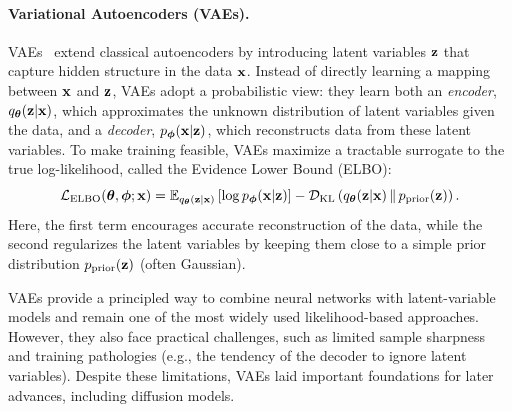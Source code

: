 \paragraph{Variational Autoencoders (VAEs).}
VAEs~\citep{kingma2013auto} extend classical autoencoders by introducing latent variables ${\mathbf{z}}$ that capture hidden structure in the data ${\mathbf{x}}$. 
Instead of directly learning a mapping between ${\mathbf{x}}$ and ${\mathbf{z}}$, VAEs adopt a probabilistic view: they learn both an \emph{encoder}, $q_{{\bm{\theta}}}({\mathbf{z}}|{\mathbf{x}})$, which approximates the unknown distribution of latent variables given the data, and a \emph{decoder}, $p_{{\bm{\phi}}}({\mathbf{x}}|{\mathbf{z}})$, which reconstructs data from these latent variables. 
To make training feasible, VAEs maximize a tractable surrogate to the true log-likelihood, called the Evidence Lower Bound (ELBO):
\begin{equation*}
    \mathcal{L}_{\text{ELBO}}({\bm{\theta}}, {\bm{\phi}}; {\mathbf{x}}) 
    = \mathbb{E}_{q_{{\bm{\theta}}}({\mathbf{z}} | {\mathbf{x}})} \left[ \log p_{{\bm{\phi}}}({\mathbf{x}} | {\mathbf{z}}) \right] 
    - \mathcal D_{\mathrm{KL}} \left( q_{{\bm{\theta}}}({\mathbf{z}} | {\mathbf{x}}) \,\|\, p_{\mathrm{prior}}({\mathbf{z}}) \right).
\end{equation*}
Here, the first term encourages accurate reconstruction of the data, while the second regularizes the latent variables by keeping them close to a simple prior distribution $p_{\mathrm{prior}}({\mathbf{z}})$ (often Gaussian).  

VAEs provide a principled way to combine neural networks with latent-variable models and remain one of the most widely used likelihood-based approaches. 
However, they also face practical challenges, such as limited sample sharpness and training pathologies (e.g., the tendency of the decoder to ignore latent variables). 
Despite these limitations, VAEs laid important foundations for later advances, including diffusion models.






